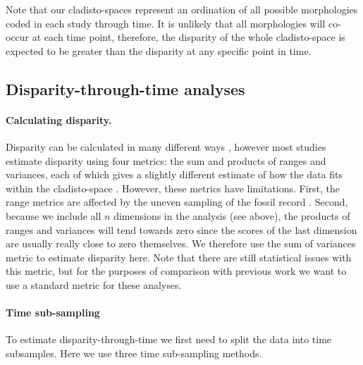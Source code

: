 \documentclass[12pt,a4paper]{article}
\begin{document}
Note that our cladisto-spaces represent an ordination of all possible morphologies coded in each study through time.
It is unlikely that all morphologies will co-occur at each time point, therefore, the disparity of the whole cladisto-space is expected to be greater than the disparity at any specific point in time.

\subsection{Disparity-through-time analyses}

\paragraph{Calculating disparity.}
\label{disparity_calc}
Disparity can be calculated in many different ways \citep[e.g.][]{Wills1994,Ciampaglio2004,thorneresetting2011,hopkinsdecoupling2013,huang2015origins}, however most studies estimate disparity using four metrics: the sum and products of ranges and variances, each of which gives a slightly different estimate of how the data fits within the cladisto-space \citep{Foote01071994,Wills1994,brusatte50,Brusatte12092008,cisneros2010,thorneresetting2011,prentice2011,brusattedinosaur2012,toljagictriassic-jurassic2013,ruta2013,bentonmodels2014,bensonfaunal2014}.
However, these metrics have limitations. 
First, the range metrics are affected by the uneven sampling of the fossil record \citep{Butler2012}.
Second, because we include all $n$ dimensions in the analysis (see above), the products of ranges and variances will tend towards zero since the scores of the last dimension are usually really close to zero themselves. 
We therefore use the sum of variances metric to estimate disparity here.
Note that there are still statistical issues with this metric, but for the purposes of comparison with previous work we want to use a standard metric for these analyses.

\paragraph{Time sub-sampling} 
\label{time_subsamples}

To estimate disparity-through-time we first need to split the data into time subsamples.
Here we use three time sub-sampling methods.
\end{document}
